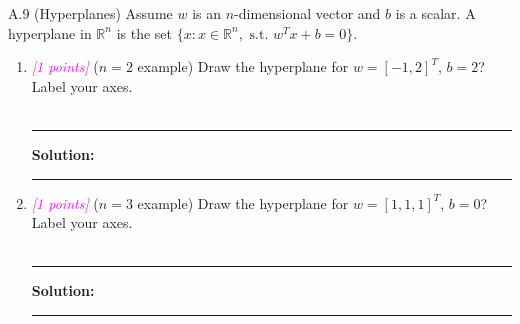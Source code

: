 \documentclass{article}
\newcommand{\field}[1]{\mathbb{#1}}
\newcommand{\1}{\mathbf{1}}
\newcommand{\R}{\field{R}} %
\newcommand{\points}[1]{\small\textcolor{magenta}{\emph{[#1 points]}} \normalsize}
\begin{document}
A.9 (Hyperplanes) Assume $w$ is an $n$-dimensional vector and $b$ is a scalar. A hyperplane in $\R^n$ is the set $\{x : x\in \R^n,\text{ s.t. } w^T x + b = 0\}$.
\begin{enumerate}
	\item \points{1} ($n=2$ example) Draw the hyperplane for $w=[-1,2]^T$, $b=2$? Label your axes.\\
\\
    \noindent\rule{\textwidth}{1pt}
    {\bf Solution:}\\
    

	\noindent\rule{\textwidth}{1pt}
	
	\item \points{1} ($n=3$ example) Draw the hyperplane for $w=[1,1,1]^T$, $b=0$? Label your axes.\\
\\
    \noindent\rule{\textwidth}{1pt}
    {\bf Solution:}\\
    
	
	    \noindent\rule{\textwidth}{1pt}
	    

\end{enumerate}
\end{document}
